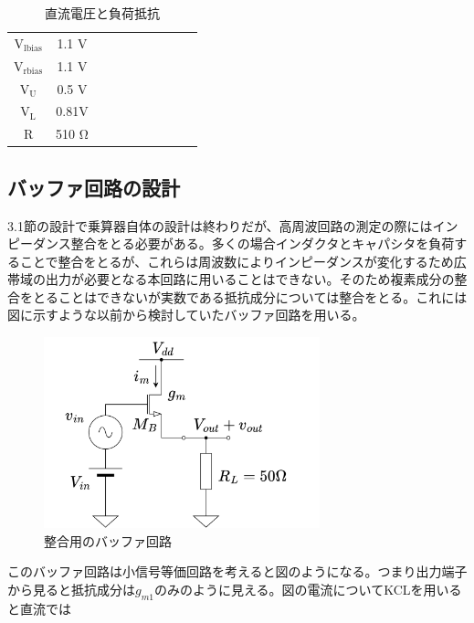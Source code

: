 \documentclass[twocolumn]{jsarticle}
\begin{document}
        \begin{table}[H]
        \caption{直流電圧と負荷抵抗}
        \label{table:bias}
        \centering
        \begin{tabular}{c|ccccccccc}
            \\
            $\mathrm{V_{lbias}}$ & 1.1 V\\
            $\mathrm{V_{rbias}}$ & 1.1 V \\
            $\mathrm{V_{U}}$     & 0.5 V  \\
            $\mathrm{V_{L}}$     & 0.81V  \\
            $\mathrm{R}$         & 510 $\mathrm{\Omega}$  
        \end{tabular}
        \end{table}

    \subsection{バッファ回路の設計}
        3.1節の設計で乗算器自体の設計は終わりだが、高周波回路の測定の際にはインピーダンス整合をとる必要がある。多くの場合インダクタとキャパシタを負荷することで整合をとるが、これらは周波数によりインピーダンスが変化するため広帯域の出力が必要となる本回路に用いることはできない。そのため複素成分の整合をとることはできないが実数である抵抗成分については整合をとる。これには図に示すような以前から検討していたバッファ回路を用いる。
        \begin{figure}[H]
            \begin{center}
                \includegraphics*[width = 80mm]{figures/resister_buf.png}
                \caption{整合用のバッファ回路}
                \label{fig:buf}
            \end{center}
        \end{figure}
        このバッファ回路は小信号等価回路を考えると図のようになる。つまり出力端子から見ると抵抗成分は$g_{m1}$のみのように見える。図の電流についてKCLを用いると直流では
\end{document}
